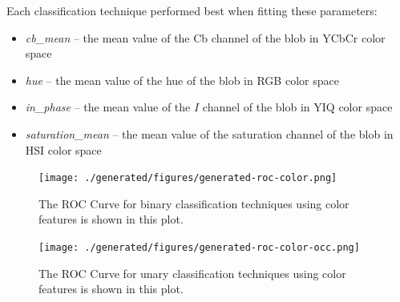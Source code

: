 \documentclass[letterpaper, notitlepage]{report}
\begin{document}
{
\renewcommand{\arraystretch}{0.9}



}

Each classification technique performed best when fitting these parameters:
\begin{itemize}
	\item{\textit{cb\_mean} -- the mean value of the Cb channel of the blob in YCbCr color space}
	\item{\textit{hue} -- the mean value of the hue of the blob in RGB color space}
	\item{\textit{in\_phase} -- the mean value of the $I$ channel of the blob in YIQ color space}
	\item{\textit{saturation\_mean} -- the mean value of the saturation channel of the blob in HSI color space}
\end{itemize}

\begin{figure}[!htbp]
	\centering
	\texttt{[image: ./generated/figures/generated-roc-color.png]}
	\caption[ROC Curve for binary classification using color features]{The ROC Curve for binary classification techniques using color features is shown in this plot.}
	\label{fig:roc-color}
\end{figure}

\begin{figure}[!htbp]
	\centering
	\texttt{[image: ./generated/figures/generated-roc-color-occ.png]}
	\caption[ROC Curve for unary classification using color features]{The ROC Curve for unary classification techniques using color features is shown in this plot.}
	\label{fig:roc-color-occ}
\end{figure}
\end{document}
